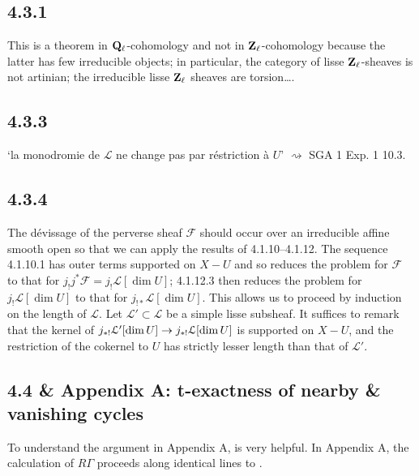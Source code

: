 \documentclass[deligne.tex]{subfiles}
\begin{document}
\subsection*{4.3.1} This is a theorem in $\mathbf{Q}_\ell$-cohomology and not in
$\mathbf{Z}_\ell$-cohomology because the latter has few irreducible objects; in
particular, the category of lisse $\mathbf{Z}_\ell$-sheaves is not artinian;
the irreducible lisse $\mathbf{Z}_\ell$ sheaves are torsion….

\subsection*{4.3.3} `la monodromie de $\mathcal L$ ne change pas par
réstriction à $U$' $\rightsquigarrow$ SGA 1 Exp. 1 10.3.

\subsection*{4.3.4} The dévissage of the perverse sheaf $\mathcal F$ should
occur over an irreducible affine smooth open so that we can apply the
results of 4.1.10--4.1.12. The sequence 4.1.10.1 has outer terms supported
on $X-U$ and so reduces the problem for $\mathcal F$ to that for
$j_!j^*\mathcal F=j_!\mathcal L[\dim U]$; 4.1.12.3 then reduces
the problem for $j_!\mathcal L[\dim U]$ to that for
$j_{!*}\mathcal L[\dim U]$. This allows us to proceed by induction on the
length of $\mathcal L$. Let $\mathcal L'\subset\mathcal L$ be a simple
lisse subsheaf. It suffices to remark that the kernel of
$j_{*!}\mathcal L'[\dim U]\rightarrow j_{*!}\mathcal L[\dim U]$ is supported on
$X-U$, and the restriction of the cokernel to $U$ has strictly lesser 
length than that of $\mathcal L'$.

\subsection*{4.4 \& Appendix A: t-exactness of nearby \& vanishing cycles}
To understand the argument in Appendix A, \cite[\S3.1]{Illusie} is very
helpful.
In Appendix A, the calculation of $R\Gamma$ proceeds along identical lines
to \cite[7.11.3 \& 10.7]{Modular}.
\end{document}
